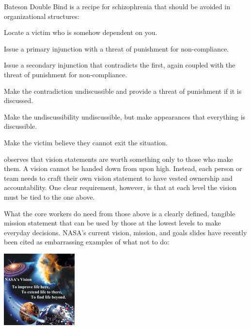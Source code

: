 \documentclass{tufte-handout}
\begin{document}
 Bateson Double Bind%
is a recipe for schizophrenia that should be avoided in organizational
structures:
\begin{compactenum}
 \item Locate a victim who is somehow dependent on you.
 \item Issue a primary injunction with a threat of punishment for
       non-compliance.
 \item Issue a secondary injunction that contradicts the first, again
       coupled with the threat of punishment for non-compliance.
 \item Make the contradiction undiscussible and provide a threat of
       punishment if it is discussed.
 \item Make%
       the undiscussibility undiscussible, but make appearances
       that everything is discussible.
 \item Make the victim believe they cannot exit the situation.
\end{compactenum}

 observes that vision statements are worth something
only to those who make them.%
A vision cannot be handed down from upon high.
Instead, each person or team needs to craft their own vision statement
to have vested ownership and accountability.
One clear requirement, however, is that at each level the vision must be
tied to the one above.

What%
the core workers do need from those above is a clearly defined,
tangible mission statement that can be used by those at the lowest levels
to make everyday decisions.
NASA's current vision, mission, and goals slides have recently been
cited%
as embarrassing examples of what not to do:\\[5pt]
\begin{center}
\includegraphics{nasa_vision_sm}
\end{center}
\end{document}
